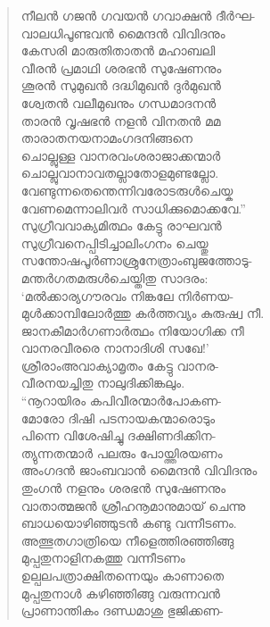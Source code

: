 \begin{verse}
നീലന്‍ ഗജന്‍ ഗവയന്‍ ഗവാക്ഷന്‍ ദീര്‍ഘ-\\
വാലധിപൂണ്ടവന്‍ മൈന്ദന്‍ വിവിദനും\\
കേസരി മാരുതിതാതന്‍ മഹാബലി\\
വീരന്‍ പ്രമാഥി ശരഭന്‍ സുഷേണനും\\
ശൂരന്‍ സുമുഖന്‍ ദദ്ധിമുഖന്‍ ദുര്‍മുഖന്‍\\
ശ്വേതന്‍ വലീമുഖനും ഗന്ധമാദനന്‍\\
താരന്‍ വൃഷഭന്‍ നളന്‍ വിനതന്‍ മമ\\
താരാതനയനാമംഗദനിങ്ങനെ\\
ചൊല്ലുള്ള വാനരവംശരാജാക്കന്മാര്‍\\
ചൊല്ലുവാനാവതല്ലാതോളമുണ്ടല്ലോ.\\
വേണ്ടുന്നതെന്തെന്നിവരോടരുള്‍ചെയ്ക\\
വേണമെന്നാലിവര്‍ സാധിക്കുമൊക്കവേ.”\\
സുഗ്രീവവാക്യമിത്ഥം കേട്ടു രാഘവന്‍\\
സുഗ്രീവനെപ്പിടിച്ചാലിംഗനം ചെയ്തു\\
സന്തോഷപൂര്‍ണാശ്രുനേത്രാംബുജത്തോടു-\\
മന്തര്‍ഗതമരുള്‍ചെയ്തിതു സാദരം:\\
‘മല്‍ക്കാര്യഗൗരവം നിങ്കലേ നിര്‍ണയ-\\
മുള്‍ക്കാമ്പിലോര്‍ത്തു കര്‍ത്തവ്യം കുരുഷ്വ നീ.\\
ജാനകീമാര്‍ഗണാര്‍ത്ഥം നിയോഗിക്ക നീ\\
വാനരവീരരെ നാനാദിശി സഖേ!’\\
ശ്രീരാംഅവാക്യാമൃതം കേട്ടു വാനര-\\
വീരനയച്ചിതു നാലുദിക്കിങ്കലും.\\
“നൂറായിരം കപിവീരന്മാര്‍പോകണ-\\
മോരോ ദിഷി പടനായകന്മാരൊടും\\
പിന്നെ വിശേഷിച്ചു ദക്ഷിണദിക്കിന-\\
ത്യുന്നതന്മാര്‍ പലരും പോയ്ത്തിരയണം\\
അംഗദന്‍ ജാംബവാന്‍ മൈന്ദന്‍ വിവിദനും\\
തുംഗന്‍ നളനും ശരഭന്‍ സുഷേണനും\\
വാതാത്മജന്‍ ശ്രീഹനൂമാനുമായ് ചെന്നു\\
ബാധയൊഴിഞ്ഞുടന്‍ കണ്ടു വന്നീടണം.\\
അത്ഭുതഗാത്രിയെ നീളെത്തിരഞ്ഞിങ്ങു\\
മുപ്പതുനാളിനകത്തു വന്നീടണം\\
ഉല്പലപത്രാക്ഷിതന്നെയും കാണാതെ\\
മുപ്പതുനാള്‍ കഴിഞ്ഞിങ്ങു വരുന്നവന്‍\\
പ്രാണാന്തികം ദണ്ഡമാശു ഭുജിക്കണ-\\

\end{verse}
